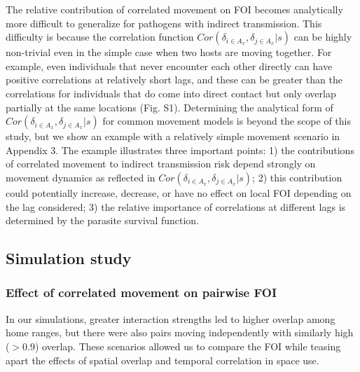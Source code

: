 \documentclass[letterpaper]{article}
\begin{document}
The relative contribution of correlated movement on FOI becomes analytically more difficult to generalize for pathogens with indirect transmission. This difficulty is because the correlation function $Cor(\delta_{i \in A_x}, \delta_{j \in A_x} | s)$ can be highly non-trivial even in the simple case when two hosts are moving together. For example, even individuals that never encounter each other directly can have positive correlations at relatively short lags, and these can be greater than the correlations for individuals that do come into direct contact but only overlap partially at the same locations (Fig. S1). Determining the analytical form of $Cor(\delta_{i \in A_x}, \delta_{j \in A_x} | s)$ for common movement models is beyond the scope of this study, but we show an example with a relatively simple movement scenario in Appendix 3. The example illustrates three important points: 1) the contributions of correlated movement to indirect transmission risk depend strongly on movement dynamics as reflected in $Cor(\delta_{i \in A_x}, \delta_{j \in A_x} | s)$; 2) this contribution could potentially increase, decrease, or have no effect on local FOI depending on the lag considered; 3) the relative importance of correlations at different lags is determined by the parasite survival function.

\subsection*{Simulation study}

\subsubsection*{Effect of correlated movement on pairwise FOI}

In our simulations, greater interaction strengths led to higher overlap among home ranges, but there were also pairs moving independently with similarly high  ($>$0.9) overlap. %
These scenarios allowed us to compare the FOI while teasing apart the effects of spatial overlap and temporal correlation in space use. 
\end{document}
